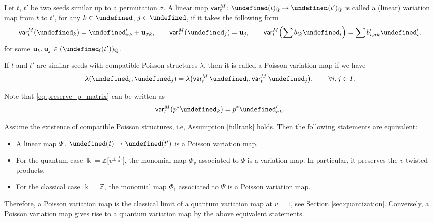 \documentclass[10pt,a4paper]{amsart}
\newcommand{\kk}{\Bbbk}
\newcommand{\Z}{\mathbb{Z}}
\newcommand{\Q}{\mathbb{Q}}
\newcommand{\opname}[1]{\operatorname{\mathsf{#1}}}
\newcommand{\uu}{{\underline{u}}}
\newcommand{\diag}{{\delta}}
\renewcommand{\diag}{{d}}
\newcommand{\var}{\opname{var}}
\newcommand{\fv}{\opname{f}}
\newcommand{\ufv}{\opname{uf}}
\let\Mc\undefined
\let\Iufv\undefined
\let\Ifv\undefined
\let\ee\undefined
\let\ff\undefined
\newcommand{\Mc}{M^\circ}
\newcommand{\Iufv}{I_{\ufv}}
\newcommand{\Ifv}{I_{\fv}}
\renewcommand{\diag}{\opname{d}'}
\newcommand{\ee}{\mathbf{e}}
\newcommand{\ff}{\mathbf{f}}
\renewcommand{\uu}{\mathbf{u}}
\numberwithin{equation}{section}
\begin{document}
\begin{Definition}\label{def:variation_linear}
Let $t$, $t'$ be two seeds similar up to a permutation $\sigma$.
A linear map $\var_{t}^{M}\colon\Mc(t)_{\Q}\allowbreak\rightarrow\Mc(t')_{\Q}$ is
called a (linear) variation map from $t$ to $t'$, for any $k\in\Iufv$,
$j\in\Ifv$, if it takes the following form
\begin{gather}
\var_{t}^{M}(\ff_{k}) = \ff'_{\sigma k}+\uu_{\sigma k},\qquad
\var_{t}^{M}(\ff_{j}) = \uu_{j},\qquad
\var_{t}^{M}\Bigl(\sum b_{ik}\ff_{i}\Bigr) = \sum b'_{i,\sigma k}\ff'_{i},\label{eq:preserve_p_matrix}
\end{gather}
for some $\uu_{k},\uu_{j}\in(\Mc_{\fv}(t'))_{\Q}$.

If $t$ and $t'$ are similar seeds with compatible Poisson structures $\lambda$, then
it is called a Poisson variation map if we have
\begin{gather*}
\lambda(\ff_{i},\ff_{j}) = \lambda\bigl(\var_{t}^{M}\ff_{i},\var_{t}^{M}\ff_{j}\bigr),\qquad \forall i,j\in I.
\end{gather*}
\end{Definition}

Note that \eqref{eq:preserve_p_matrix} can be written as
\begin{equation}\label{eq:preserve_p_map}
\var_{t}^{M}(p^{*}\ee_{k}) =p^{*}\ee'_{\sigma k}.
\end{equation}

\begin{Remark}\label{rem:Poisson_quantum_variation}
Assume the existence of compatible Poisson structures, i.e, Assumption \ref{fullrank} holds. Then the following statements are equivalent:
\begin{itemize}\itemsep=0pt
 \item A linear map $\varPsi\colon\Mc(t)\rightarrow \Mc(t')$ is a Poisson variation map.
 \item For the quantum case $\kk=\Z\big[v^{\pm\frac{1}{\diag}}\big]$, the monomial map $\varPhi_v$ associated to $\varPsi$ is a variation map. In particular, it preserves the $v$-twisted products.
 \item For the classical case $\kk=\Z$, the monomial map $\varPhi_1$ associated to $\varPsi$ is a Poisson variation map.
\end{itemize}
Therefore, a Poisson variation map is the classical limit of a quantum variation map at $v=1$, see Section \ref{sec:quantization}. Conversely, a Poisson variation map gives rise to a quantum variation map by the above equivalent statements.
\end{Remark}
\end{document}
